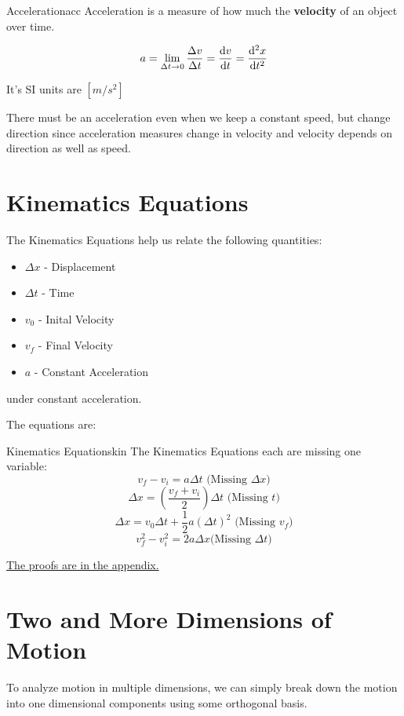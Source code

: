 \documentclass{report}
\begin{document}
\begin{mytheo}{Acceleration}{acc}
    Acceleration is a measure of how much the \textbf{velocity} of an object over time. 
    
    $$a = \lim_{\Delta t \to 0}\frac{\Delta v}{\Delta t} = \dv{v}{t}=\dv[2]{x}{t}$$
    
    It's SI units are $[m/s^2]$
\end{mytheo}

There must be an acceleration even when we keep a constant speed, but change direction since acceleration measures change in velocity and velocity depends on direction as well as speed.





\section{Kinematics Equations}
The Kinematics Equations help us relate the following quantities:
\begin{itemize}
    \item $\Delta x$ - Displacement
    \item $\Delta t$ - Time
    \item $v_0$ - Inital Velocity
    \item $v_f$ - Final Velocity
    \item $a$ - Constant Acceleration
\end{itemize}

under constant acceleration. 

The equations are:
\begin{mytheo}{Kinematics Equations}{kin}
    The Kinematics Equations each are missing one variable:
    $$v_f-v_i = a\Delta t \text{  (Missing }\Delta x \text{)}$$
    $$\Delta x = \left( \frac{v_f+v_i}{2}\right)\Delta t \text{  (Missing } t \text{)}$$
    $$\Delta x = v_0\Delta t + \frac{1}{2}a(\Delta t)^2 \text{  (Missing } v_f \text{)} $$
    $$v_f^2-v_i^2 = 2a\Delta x \text{(Missing } \Delta t \text{)}$$
\end{mytheo}

\hyperref[sec:kin]{The proofs are in the appendix.}

\section{Two and More Dimensions of Motion}
To analyze motion in multiple dimensions, we can simply break down the motion into one dimensional components using some orthogonal basis.
\end{document}
